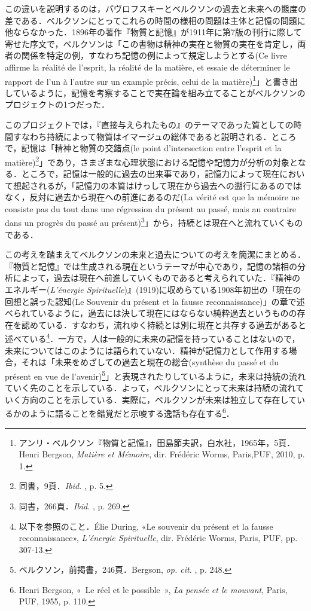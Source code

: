 この違いを説明するのは，パヴロフスキーとベルクソンの過去と未来への態度の差である．ベルクソンにとってこれらの時間の様相の問題は主体と記憶の問題に他ならなかった．1896年の著作『物質と記憶』が1911年に第7版の刊行に際して寄せた序文で，ベルクソンは「この書物は精神の実在と物質の実在を肯定し，両者の関係を特定の例，すなわち記憶の例によって規定しようとする(Ce livre affirme la réalité de l'esprit, la réalité de la matière, et essaie de déterminer le rapport de l'un à l'autre sur un example précis, celui de la matière)\footnote{アンリ・ベルクソン『物質と記憶』，田島節夫訳，白水社，1965年，5頁．Henri Bergson, \emph{Matière et Mémoire}, dir. Frédéric Worms, Paris,PUF, 2010, p. 1.}」と書き出しているように，記憶を考察することで実在論を組み立てることがベルクソンのプロジェクトの1つだった．

このプロジェクトでは，『直接与えられたもの』のテーマであった質としての時間すなわち持続によって物質はイマージュの総体であると説明される．ところで，記憶は「精神と物質の交錯点(le point d'intersection entre l'esprit et la matière)\footnote{同書，9頁．\emph{Ibid. }, p. 5.}」であり，さまざまな心理状態における記憶や記憶力が分析の対象となる．ところで，記憶は一般的に過去の出来事であり，記憶力によって現在において想起されるが，「記憶力の本質はけっして現在から過去への遡行にあるのではなく，反対に過去から現在への前進にあるのだ(La vérité est que la mémoire ne consiste pas du tout dans une régression du présent au passé, mais au contraire dans un progrès du passé au présent)\footnote{同書，266頁．\emph{Ibid. }, p. 269.}」から，持続とは現在へと流れていくものである．

この考えを踏まえてベルクソンの未来と過去についての考えを簡潔にまとめる．『物質と記憶』では生成される現在というテーマが中心であり，記憶の諸相の分析によって，過去は現在へ前進していくものであると考えられていた．『精神のエネルギー(\emph{L'énergie Spirituelle})』(1919)に収めらている1908年初出の「現在の回想と誤った認知(Le Souvenir du présent et la fausse reconnaissance)」の章で述べられているように，過去には決して現在にはならない純粋過去というものの存在を認めている．すなわち，流れゆく持続とは別に現在と共存する過去があると述べている\footnote{以下を参照のこと．Élie During, «Le souvenir du présent et la fausse reconnaissance», \emph{L'énergie Spirituelle}, dir. Frédéric Worms, Paris, PUF, pp. 307-13.}．一方で，人は一般的に未来の記憶を持っていることはないので，未来についてはこのようには語られていない．精神が記憶力として作用する場合，それは「未来をめざしての過去と現在の総合(synthèse du passé et du présent en vue de l'avenir)\footnote{ベルクソン，前掲書，246頁．Bergson, \emph{op. cit. }, p. 248.}」と表現されたりしているように，未来は持続の流れていく先のことを示している．よって，ベルクソンにとって未来は持続の流れていく方向のことを示している．実際に，ベルクソンが未来は独立して存在しているかのように語ることを錯覚だと示唆する逸話も存在する\footnote{Henri Bergson, «~Le réel et le possible~», \emph{La pensée et le mouvant}, Paris, PUF, 1955, p. 110.}．


